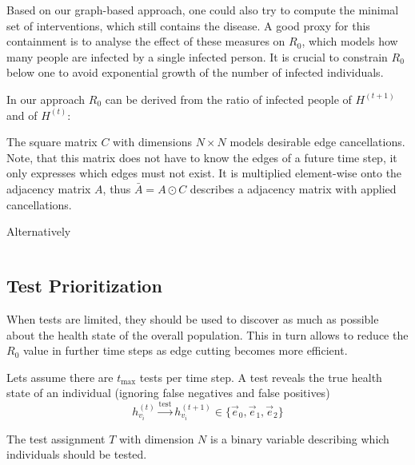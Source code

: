 \documentclass[%
 reprint,
 amsmath,amssymb,showkeys,
 aps,
]{revtex4-1}
\begin{document}
Based on our graph-based approach, one could also try to compute the minimal set of interventions, which still contains the disease.
A good proxy for this containment is to analyse the effect of these measures on $R_0$, which models how many people are infected by a single infected person.
It is crucial to constrain $R_0$ below one to avoid exponential growth of the number of infected individuals.

In our approach $R_0$ can be derived from the ratio of infected people of $H^{(t+1)}$ and of $H^{(t)}$:
\begin{equation}
\end{equation}

The square matrix $C$ with dimensions $N \times N$ models desirable edge cancellations.
Note, that this matrix does not have to know the edges of a future time step, it only expresses which edges must not exist.
It is multiplied element-wise onto the adjacency matrix $A$, thus $\bar{A} = A \odot C$ describes a adjacency matrix with applied cancellations.

\begin{equation}
\end{equation}
Alternatively

\begin{equation}
\end{equation}


\subsection{Test Prioritization}
When tests are limited, they should be used to discover as much as possible about the health state of the overall population.
This in turn allows to reduce the $R_0$ value in further time steps as edge cutting becomes more efficient.

Lets assume there are $t_{\text{max}}$ tests per time step.
A test reveals the true health state of an individual (ignoring false negatives and false positives)
\begin{equation}
h_{{v}_i}^{(t)} \xrightarrow{\text{test}} h_{{v}_i}^{(t+1)} \in \{\vec{e}_0, \vec{e}_1, \vec{e}_2 \}
\end{equation}

The test assignment $T$ with dimension $N$ is a binary variable describing which individuals should be tested.
\end{document}
